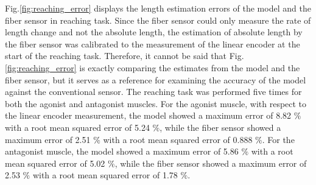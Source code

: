 Fig.\ref{fig:reaching_error} displays the length estimation errors of the model and the fiber sensor in reaching task. Since the fiber sensor could only measure the rate of length change and not the absolute length, the estimation of absolute length by the fiber sensor was calibrated to the measurement of the linear encoder at the start of the reaching task. Therefore, it cannot be said that Fig.\ref{fig:reaching_error} is exactly comparing the estimates from the model and the fiber sensor, but it serves as a reference for examining the accuracy of the model against the conventional sensor. The reaching task was performed five times for both the agonist and antagonist muscles. For the agonist muscle, with respect to the linear encoder measurement, the model showed a maximum error of 8.82 $\%$ with a root mean squared error of 5.24 $\%$, while the fiber sensor showed a maximum error of 2.51 $\%$ with a root mean squared error of 0.888 $\%$. For the antagonist muscle, the model showed a maximum error of 5.86 $\%$ with a root mean squared error of 5.02 $\%$, while the fiber sensor showed a maximum error of 2.53 $\%$ with a root mean squared error of 1.78 $\%$. 
\begin{table}[H]
    \centering
    \caption{Parameters for Length Estimation} 
    \label{tab:PAM_reflex}
\end{table}

\begin{table}[H]
    \centering
    \caption{Error Percentages of Length Estimation in Reaching Task}
    \label{tab:PAM_reflex}
\end{table}


